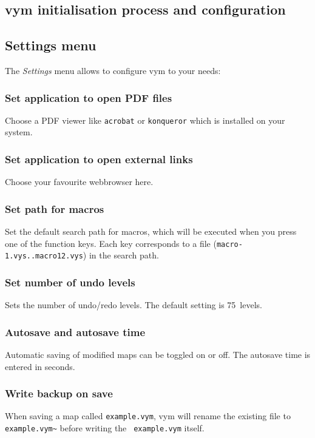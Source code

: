 \documentclass[12pt,a4paper]{article}
\newcommand{\vym}{{\sc vym }}
\begin{document}
\begin{appendix}

\section{\vym initialisation process and configuration}
\subsection {Settings menu}
	The {\em Settings} menu allows to configure \vym to your needs:

\subsubsection*{Set application to open PDF files} Choose a PDF
	viewer like {\tt acrobat} or {\tt konqueror} which is installed on
	your system.

\subsubsection*{Set application to open external links}
	Choose your favourite webbrowser here.

\subsubsection*{Set path for macros}
	Set the default search path for macros, which will be executed when
	you press one of the function keys. Each key corresponds to a file
	({\tt macro-1.vys..macro12.vys}) in the search path.

\subsubsection*{Set number of undo levels}
	Sets the number of undo/redo levels. The default setting is
	75~levels.

\subsubsection*{Autosave and autosave time}
	Automatic saving of modified maps can be toggled on or off. The
	autosave time is entered in seconds.

\subsubsection*{Write backup on save}
	When saving a map called {\tt example.vym}, \vym will rename the
	existing file to {\tt example.vym\~{}} before writing the {\tt
	example.vym} itself.


\end{appendix}
\end{document}
